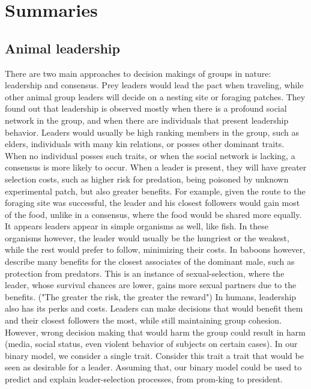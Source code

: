 \documentclass[11pt]{article}
\begin{document}
\clearpage
\section{Summaries}
\subsection{Animal leadership \citep{animal_leadership}}
There are two main approaches to decision makings of groups in nature: leadership and consensus. Prey leaders would lead the pact when traveling, while other animal group leaders will decide on a nesting site or foraging patches. They found out that leadership is observed mostly when there is a profound social network in the group, and when there are individuals that present leadership behavior. Leaders would usually be high ranking members in the group, such as elders, individuals with many kin relations, or posses other dominant traits. When no individual posses such traits, or when the social network is lacking, a consensus is more likely to occur.
When a leader is present, they will have greater selection costs, such as higher risk for predation, being poisoned by unknown experimental patch, but also greater benefits. For example, given the route to the foraging site was successful, the leader and his closest followers would gain most of the food, unlike in a consensus, where the food would be shared more equally.
It appears leaders appear in simple organisms as well, like fish. In these organisms however, the leader would usually be the hungriest or the weakest, while the rest would prefer to follow, minimizing their costs. In baboons however, \citet{animal_leadership} describe many benefits for the closest associates of the dominant male, such as protection from predators. This is an instance of sexual-selection, where the leader, whose survival chances are lower, gains more sexual partners due to the benefits. ("The greater the risk, the greater the reward")
In humans, leadership also has its perks and costs. Leaders can make decisions that would benefit them and their closest followers the most, while still maintaining group cohesion. However, wrong decision making that would harm the group could result in harm (media, social status, even violent behavior of subjects on certain cases).
In our binary model, we consider a single trait. Consider this trait a trait that would be seen as desirable for a leader. Assuming that, our binary model could be used to predict and explain leader-selection processes, from prom-king to president.

\clearpage


\end{document}
